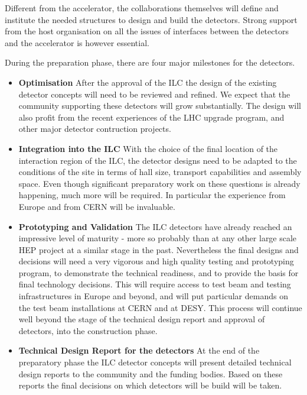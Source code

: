 \documentclass[%
 reprint,
 amsmath,amssymb,
 aps,
]{revtex4-1}
\begin{document}
Different from the accelerator, the collaborations themselves will define and institute the needed structures to design and build the detectors. Strong support from the host organisation on all the issues of interfaces between the detectors and the accelerator is however essential. 

During the preparation phase, there are four major milestones for the
detectors.
\begin{itemize}

\item{\bfseries Optimisation} After the approval of the ILC the design of the existing detector concepts will need to be reviewed and refined. We expect that the community supporting these detectors will grow substantially. The design will also profit from the recent experiences of the LHC upgrade program, and other major detector contruction projects. 

\item{\bfseries Integration into the ILC}
With the choice of the final location of the interaction region of the ILC, the detector designs need to be adapted to the
conditions of the site in terms of hall size, transport capabilities and
assembly space. Even though significant preparatory work on these questions is already happening, much more will be required. In particular the experience from Europe and from CERN will be invaluable. 

 
\item{\bfseries Prototyping and Validation}
The ILC detectors have already reached an impressive level of maturity - more so probably than at any other large scale HEP project at a similar stage in the past. Nevertheless the final designs and decisions will need a very vigorous and high quality testing and prototyping program, to demonstrate the technical readiness, and to provide the basis for final technology decisions. This will require access to test beam and testing infrastructures in Europe and beyond, and will put particular demands on the test beam installations at CERN and at DESY. This process will continue well beyond the stage of the technical design report and approval of detectors, into the construction phase.

\item{\bfseries Technical Design Report for the detectors}
At the end of the preparatory phase the ILC detector concepts will present detailed technical design reports to the community and the funding bodies. Based on these reports the final decisions on which detectors will be build will be taken. 
\end{itemize}
\end{document}
